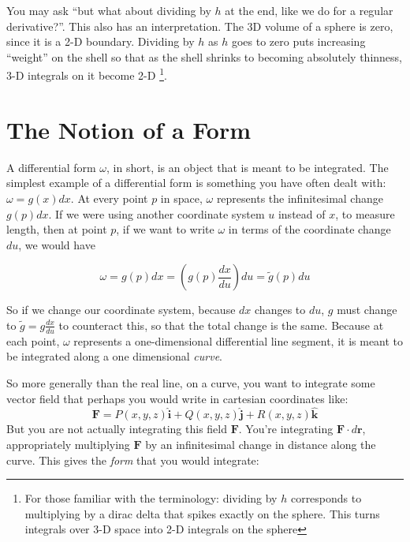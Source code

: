\documentclass[../master.tex]{subfiles}
\begin{document}
	You may ask ``but what about dividing by $h$ at the end, like we do for a regular derivative?''. This also has an interpretation. The 3D volume of a sphere is zero, since it is a 2-D boundary. Dividing by $h$ as $h$ goes to zero puts increasing ``weight'' on the shell so that as the shell shrinks to becoming absolutely thinness, 3-D integrals on it become 2-D \footnote{For those familiar with the terminology: dividing by $h$ corresponds to multiplying by a dirac delta that spikes exactly on the sphere. This turns integrals over 3-D space into 2-D integrals on the sphere}.
	
	
	
\section{The Notion of a Form}

	A differential form $\omega$, in short, is an object that is meant to be integrated. The simplest example of a differential form is something you have often dealt with: $\omega = g(x) dx$. At every point $p$ in space, $\omega$ represents the infinitesimal change $g(p) dx$. If we were using another coordinate system $u$ instead of $x$, to measure length, then at point $p$, if we want to write $\omega$ in terms of the coordinate change $du$, we would have
	
	\begin{equation}
		\omega = g(p) dx = \left( g(p) \frac{dx}{du} \right) du = \tilde g (p) du
	\end{equation}
	
	So if we change our coordinate system, because $dx$ changes to $du$, $g$ must change to $\tilde g = g \frac{dx}{du}$ to counteract this, so that the total change is the same. Because at each point, $\omega$ represents a one-dimensional differential line segment, it is meant to be integrated along a one dimensional \emph{curve}.
	
	So more generally than the real line, on a curve, you want to integrate some vector field that perhaps you would write in cartesian coordinates like:
	\begin{equation*}
		\mathbf{F} = P(x,y,z)  \mathbf{\hat i} + Q(x,y,z)  \mathbf{\hat j} + R (x,y,z) \mathbf{\hat k}
	\end{equation*}
	But you are not actually integrating this field $\mathbf{F}$. You're integrating $\mathbf{F}\cdot d\mathbf{r}$, appropriately multiplying $\mathbf{F}$ by an infinitesimal change in distance along the curve. This gives the \emph{form} that you would integrate:
	
\end{document}
